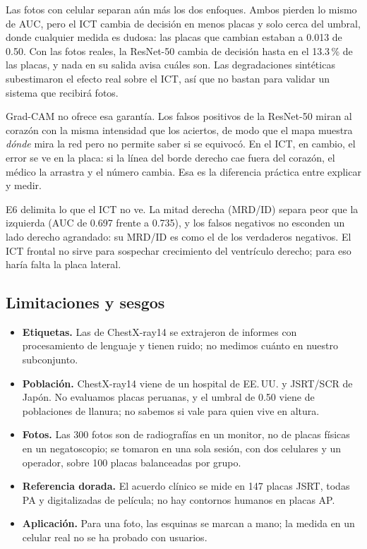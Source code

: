 \documentclass[conference]{IEEEtran}
\begin{document}
Las fotos con celular separan aún más los dos enfoques. Ambos pierden lo mismo de AUC, pero el ICT cambia de decisión
en menos placas y solo cerca del umbral, donde cualquier medida es dudosa: las placas que cambian estaban a 0.013
de 0.50. Con las fotos reales, la ResNet-50 cambia de decisión hasta en el 13.3\,\% de las placas, y nada en su
salida avisa cuáles son. Las
degradaciones sintéticas subestimaron el efecto real sobre el ICT, así que no bastan para validar un sistema que
recibirá fotos.

Grad-CAM no ofrece esa garantía. Los falsos positivos de la ResNet-50 miran al corazón con la misma intensidad que
los aciertos, de modo que el mapa muestra \emph{dónde} mira la red pero no permite saber si se equivocó. En el ICT,
en cambio, el error se ve en la placa: si la línea del borde derecho cae fuera del corazón, el médico la arrastra y
el número cambia. Esa es la diferencia práctica entre explicar y medir.

E6 delimita lo que el ICT no ve. La mitad derecha (MRD/ID) separa peor que la izquierda (AUC de 0.697 frente a
0.735), y los falsos negativos no esconden un lado derecho agrandado: su MRD/ID es como el de los verdaderos
negativos. El ICT frontal no sirve para sospechar crecimiento del ventrículo derecho; para eso haría falta la placa
lateral.

\subsection{Limitaciones y sesgos}

\begin{itemize}
\item \textbf{Etiquetas.} Las de ChestX-ray14 se extrajeron de informes con procesamiento de lenguaje y tienen
  ruido; no medimos cuánto en nuestro subconjunto.
\item \textbf{Población.} ChestX-ray14 viene de un hospital de EE.\,UU. y JSRT/SCR de Japón. No evaluamos placas
  peruanas, y el umbral de 0.50 viene de poblaciones de llanura; no sabemos si vale para quien vive en altura.
\item \textbf{Fotos.} Las 300 fotos son de radiografías en un monitor, no de placas físicas en un negatoscopio;
  se tomaron en una sola sesión, con dos celulares y un operador, sobre 100 placas balanceadas por grupo.
\item \textbf{Referencia dorada.} El acuerdo clínico se mide en 147 placas JSRT, todas PA y digitalizadas de
  película; no hay contornos humanos en placas AP.
\item \textbf{Aplicación.} Para una foto, las esquinas se marcan a mano; la medida en un celular real no se ha
  probado con usuarios.
\end{itemize}
\end{document}
